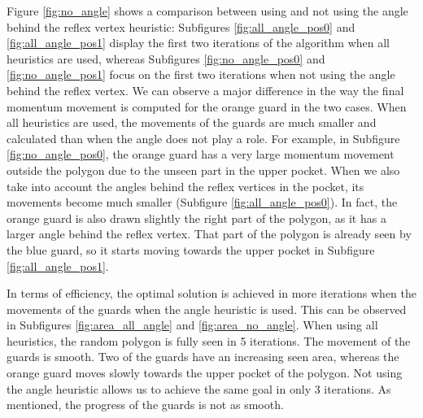 Figure \ref{fig:no_angle} shows a comparison between using and not using the angle behind the reflex vertex heuristic: Subfigures \ref{fig:all_angle_pos0} and \ref{fig:all_angle_pos1} display the first two iterations of the algorithm when all heuristics are used, whereas  Subfigures \ref{fig:no_angle_pos0} and \ref{fig:no_angle_pos1} focus on the first two iterations when not using the angle behind the reflex vertex.
We can observe a major difference in the way the final momentum movement is computed for the orange guard in the two cases. When all heuristics are used, the movements of the guards are much smaller and calculated than when the angle does not play a role. For example, in Subfigure \ref{fig:no_angle_pos0}, the orange guard has a very large momentum movement outside the polygon due to the unseen part in the upper pocket. When we also take into account the angles behind the reflex vertices in the pocket, its movements become much smaller (Subfigure \ref{fig:all_angle_pos0}). In fact, the orange guard is also drawn slightly the right part of the polygon, as it has a larger angle behind the reflex vertex. That part of the polygon is already seen by the blue guard, so it starts moving towards the upper pocket in Subfigure \ref{fig:all_angle_pos1}.

In terms of efficiency, the optimal solution is achieved in more iterations when the movements of the guards when the angle heuristic is used. This can be observed in Subfigures \ref{fig:area_all_angle} and \ref{fig:area_no_angle}. When using all heuristics, the random polygon is fully seen in 5 iterations. The movement of the guards is smooth. Two of the guards have an increasing seen area, whereas the orange guard moves slowly towards the upper pocket of the polygon. Not using the angle heuristic allows us to achieve the same goal in only 3 iterations. As mentioned, the progress of the guards is not as smooth.


